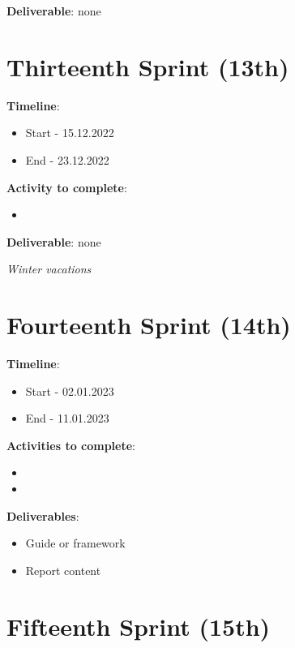 \textbf{Deliverable}: none

\section{Thirteenth Sprint (13th)}
\label{sec:planning_thirteenth}

\textbf{Timeline}:
\begin{itemize}
    \item Start - 15.12.2022
	\item End - 23.12.2022
\end{itemize}

\textbf{Activity to complete}:
\begin{itemize}
    \item {}
\end{itemize}

\textbf{Deliverable}: none

\textit{Winter vacations}

\section{Fourteenth Sprint (14th)}
\label{sec:planning_fourteenth}

\textbf{Timeline}:
\begin{itemize}
    \item Start - 02.01.2023
	\item End - 11.01.2023
\end{itemize}

\textbf{Activities to complete}:
\begin{itemize}
    \item {}
    \item {}
\end{itemize}

\textbf{Deliverables}: 
\begin{itemize}
    \item Guide or \gls{framework}
    \item Report content
\end{itemize}

\section{Fifteenth Sprint (15th)}
\label{sec:planning_fifteenth}

